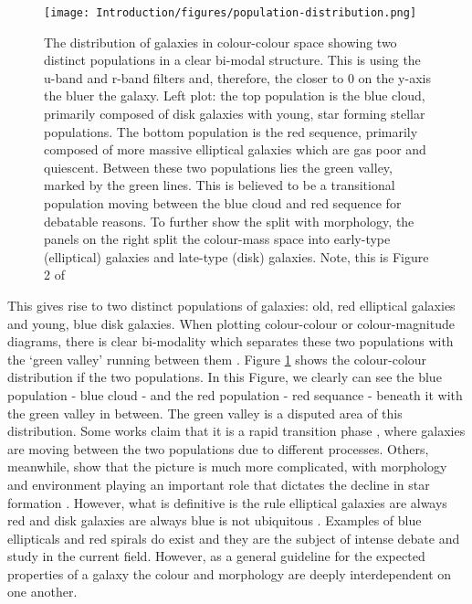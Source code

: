 \begin{figure}
\centering
\texttt{[image: Introduction/figures/population-distribution.png]}
\caption[The distribution of galaxies in colour-colour space showing two distinct populations in a clear bi-modal structure.]{The distribution of galaxies in colour-colour space showing two distinct populations in a clear bi-modal structure. This is using the u-band and r-band filters and, therefore, the closer to 0 on the y-axis the bluer the galaxy. Left plot: the top population is the blue cloud, primarily composed of disk galaxies with young, star forming stellar populations. The bottom population is the red sequence, primarily composed of more massive elliptical galaxies which are gas poor and quiescent. Between these two populations lies the green valley, marked by the green lines. This is believed to be a transitional population moving between the blue cloud and red sequence for debatable reasons. To further show the split with morphology, the panels on the right split the colour-mass space into early-type (elliptical) galaxies and late-type (disk) galaxies. Note, this is Figure 2 of \citet{2014MNRAS.440..889S}}
\label{fig:blue-red-population}
\end{figure}

This gives rise to two distinct populations of galaxies: old, red elliptical galaxies and young, blue disk galaxies. When plotting colour-colour or colour-magnitude diagrams, there is clear bi-modality which separates these two populations with the `green valley' running between them \citep{2001AJ....122.1861S}. Figure \ref{fig:blue-red-population} shows the colour-colour distribution if the two populations. In this Figure, we clearly can see the blue population - blue cloud - and the red population - red sequance - beneath it with the green valley in between. The green valley is a disputed area of this distribution. Some works claim that it is a rapid transition phase \citep{2007ApJS..173..315S, 2015MNRAS.450..435S}, where galaxies are moving between the two populations due to different processes. Others, meanwhile, show that the picture is much more complicated, with morphology and environment playing an important role that dictates the decline in star formation \citep{2014MNRAS.440..889S}. However, what is definitive is the rule elliptical galaxies are always red and disk galaxies are always blue is not ubiquitous \citep{2022MNRAS.510.4126S}. Examples of blue ellipticals and red spirals do exist \citep{2009MNRAS.396..818S, 2010MNRAS.405..783M, 2022AJ....163..150K} and they are the subject of intense debate and study in the current field. However, as a general guideline for the expected properties of a galaxy the colour and morphology are deeply interdependent on one another.


